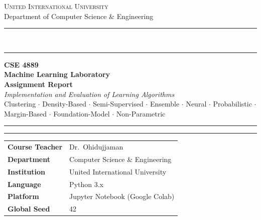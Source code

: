 \documentclass[a4paper,10pt]{article}
\begin{document}
\begin{titlepage}
\thispagestyle{empty}
\centering

\vspace*{0.4cm}
{\large\scshape United International University}\\[0.15cm]
{\small Department of Computer Science \& Engineering}\\[0.35cm]

\rule{\linewidth}{1pt}\\[0.05cm]
\rule{\linewidth}{0.4pt}

\vspace{1.4cm}

{\large\bfseries CSE 4889}\\[0.25cm]
{\Large\bfseries Machine Learning Laboratory}\\[0.9cm]

{\Huge\bfseries Assignment Report}\\[0.5cm]
{\large\itshape Implementation and Evaluation of Learning Algorithms}\\[0.35cm]

{\small
Clustering \(\cdot\) Density-Based \(\cdot\) Semi-Supervised \(\cdot\) Ensemble \(\cdot\)
Neural \(\cdot\) Probabilistic \(\cdot\) Margin-Based \(\cdot\)
Foundation-Model \(\cdot\) Non-Parametric
}\\[0.5cm]

\rule{\linewidth}{0.4pt}
\rule{\linewidth}{1pt}

\vspace{1.6cm}

\begin{minipage}{0.85\textwidth}
\centering
\begin{tabular}{@{}p{5cm}p{7cm}@{}}
\toprule
\textbf{Course Teacher} & Dr.\ Ohidujjaman \\
\textbf{Department}     & Computer Science \& Engineering \\
\textbf{Institution}    & United International University \\
\textbf{Language}       & Python 3.x \\
\textbf{Platform}       & Jupyter Notebook (Google Colab) \\
\textbf{Global Seed}    & 42 \\
\bottomrule
\end{tabular}
\end{minipage}


\end{titlepage}
\end{document}
